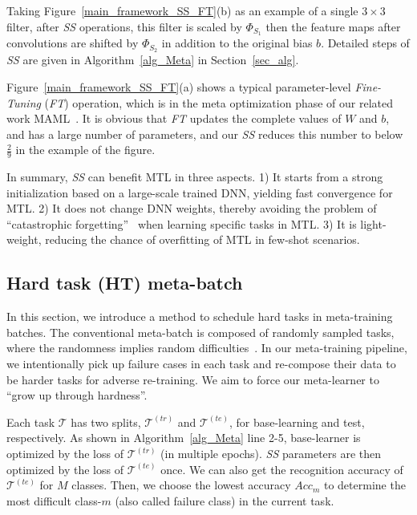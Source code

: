 Taking Figure~\ref{main_framework_SS_FT}(b) as an example of a single $3\times 3$ filter, after \emph{SS} operations, this filter is scaled by $\Phi_{S_1}$ then the feature maps after convolutions are shifted by $\Phi_{S_2}$ in addition to the original bias $b$. 
Detailed steps of \emph{SS} are given in Algorithm~\ref{alg_Meta} in Section~\ref{sec_alg}.
%

Figure~\ref{main_framework_SS_FT}(a) shows a typical parameter-level \emph{Fine-Tuning} (\emph{FT}) operation, which is in the meta optimization phase of our related work MAML~\cite{FinnAL17}.
%
It is obvious that \emph{FT} updates the complete values of $W$ and $b$, and has a large number of parameters, and our \emph{SS} reduces this number to below $\tfrac{2}{9}$ in the example of the figure. 
%


In summary, \emph{SS} can benefit MTL in three aspects.
1) It starts from a strong initialization  based on a large-scale trained DNN, yielding fast convergence for MTL.
2) It does not change DNN weights, thereby avoiding the problem of ``catastrophic forgetting''~\cite{LopezPazNIPS17, McCloskey1989} when learning specific tasks in MTL.
3) It is light-weight, reducing the chance of overfitting of MTL in few-shot scenarios.
%
%



\subsection{Hard task (HT) meta-batch}
\label{sec_HT}

In this section, we introduce a method to schedule hard tasks in meta-training batches. 
%
The conventional meta-batch is composed of randomly sampled tasks, where the randomness implies random difficulties~\cite{FinnAL17}.
In our meta-training pipeline, we intentionally pick up failure cases in each task and re-compose their data to be harder tasks for adverse re-training. 
We aim to force our meta-learner to ``grow up through hardness''. 

Each task $\mathcal{T}$ has two splits, $\mathcal{T}^{(tr)}$ and $\mathcal{T}^{(te)}$, for base-learning and test, respectively.
As shown in Algorithm~\ref{alg_Meta} line 2-5, base-learner is optimized by the loss of $\mathcal{T}^{(tr)}$ (in multiple epochs). \emph{SS} parameters are then optimized by the loss of $\mathcal{T}^{(te)}$ once.
%
We can also get the recognition accuracy of $\mathcal{T}^{(te)}$ for $M$ classes. Then, we choose the lowest accuracy $Acc_m$ to determine the most difficult class-$m$ (also called failure class) in the current task.

